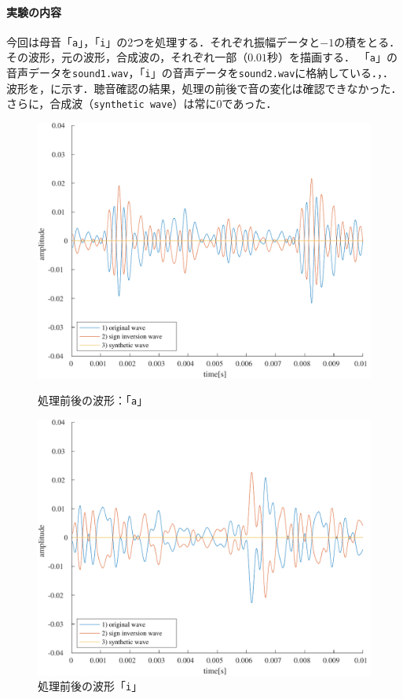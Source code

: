 \paragraph{実験の内容}
今回は母音「\texttt{a}」，「\texttt{i}」の2つを処理する．それぞれ振幅データと\(-1\)の積をとる．その波形，元の波形，合成波の，それぞれ一部（\(0.01\)秒）を描画する．
「\texttt{a}」の音声データを\texttt{sound1.wav}，「\texttt{i}」の音声データを\texttt{sound2.wav}に格納している．\scall{}，．
\result
波形を，に示す．聴音確認の結果，処理の前後で音の変化は確認できなかった．
さらに，合成波（\texttt{synthetic wave}）は常に\(0\)であった．
\begin{figure}[h]
    \centering
    \begin{minipage}[b]{.48\textwidth}
        \centering
        \includegraphics[keepaspectratio,width=\textwidth]{../../Figures/03_2_a.pdf}
        \caption{処理前後の波形：「\texttt{a}」}
        \label{fig:処理前後の波形_a}
    \end{minipage}
    \begin{minipage}[b]{.48\textwidth}
        \centering
        \includegraphics[keepaspectratio,width=\textwidth]{../../Figures/03_2_i.pdf}
        \caption{処理前後の波形「\texttt{i}」}
        \label{fig:処理前後の波形_i}
    \end{minipage}
\end{figure}
